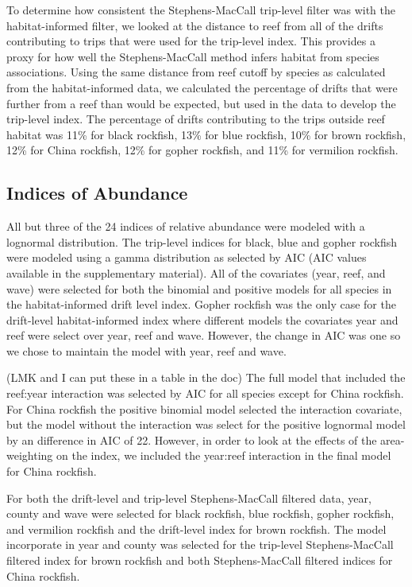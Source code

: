 \documentclass[
  12pt,
  authoryear,
  preprint,
  3p]{elsarticle}
\begin{document}
To determine how consistent the Stephens-MacCall trip-level filter was
with the habitat-informed filter, we looked at the distance to reef from
all of the drifts contributing to trips that were used for the
trip-level index. This provides a proxy for how well the
Stephens-MacCall method infers habitat from species associations. Using
the same distance from reef cutoff by species as calculated from the
habitat-informed data, we calculated the percentage of drifts that were
further from a reef than would be expected, but used in the data to
develop the trip-level index. The percentage of drifts contributing to
the trips outside reef habitat was 11\% for black rockfish, 13\% for
blue rockfish, 10\% for brown rockfish, 12\% for China rockfish, 12\%
for gopher rockfish, and 11\% for vermilion rockfish.

\hypertarget{indices-of-abundance-1}{%
\subsection{Indices of Abundance}\label{indices-of-abundance-1}}

All but three of the 24 indices of relative abundance were modeled with
a lognormal distribution. The trip-level indices for black, blue and
gopher rockfish were modeled using a gamma distribution as selected by
AIC (AIC values available in the supplementary material). All of the
covariates (year, reef, and wave) were selected for both the binomial
and positive models for all species in the habitat-informed drift level
index. Gopher rockfish was the only case for the drift-level
habitat-informed index where different models the covariates year and
reef were select over year, reef and wave. However, the change in AIC
was one so we chose to maintain the model with year, reef and wave.

(LMK and I can put these in a table in the doc) The full model that
included the reef:year interaction was selected by AIC for all species
except for China rockfish. For China rockfish the positive binomial
model selected the interaction covariate, but the model without the
interaction was select for the positive lognormal model by an difference
in AIC of 22. However, in order to look at the effects of the
area-weighting on the index, we included the year:reef interaction in
the final model for China rockfish.

For both the drift-level and trip-level Stephens-MacCall filtered data,
year, county and wave were selected for black rockfish, blue rockfish,
gopher rockfish, and vermilion rockfish and the drift-level index for
brown rockfish. The model incorporate in year and county was selected
for the trip-level Stephens-MacCall filtered index for brown rockfish
and both Stephens-MacCall filtered indices for China rockfish.
\end{document}
